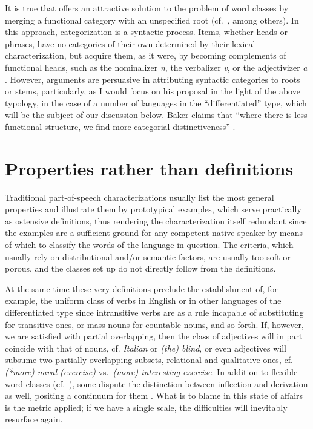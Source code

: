 \documentclass[output=paper]{langsci/langscibook}
\begin{document}
It is true that  offers an attractive solution to
the problem of word classes by merging a functional category with an
unspecified root (cf.\ \citealt{HalleMarantz1993,Marantz1997,Arad2003,Panagiotidis2015},
among others). In this approach,
categorization is a syntactic process. Items, whether
heads or phrases, have no categories of their own determined by their lexical
characterization, but acquire them, as it were, by becoming complements of
functional heads, such as the nominalizer \emph{n}, the verbalizer \emph{v}, or
the adjectivizer \emph{a} \parencite[17]{Panagiotidis2015}. However,
 arguments are persuasive in attributing syntactic
categories to roots or stems, particularly, as I would
focus on his proposal in the light of the above typology, in the case of a
number of languages in the \enquote{differentiated} type, which will be the
subject of our discussion below. Baker claims that “where there is less
functional structure, we find more categorial distinctiveness”
\parencite[268]{Baker2003}.

\section{Properties rather than definitions}\label{sec:27.2}

Traditional part-of-speech characterizations usually list the most general
properties and illustrate them by prototypical examples, which serve
practically as ostensive definitions, thus rendering the characterization
itself redundant since the examples are a sufficient ground for any competent
native speaker by means of which to classify the words of the language in
question. The criteria, which usually rely on distributional and/or semantic
factors, are usually too soft or porous, and the classes set up do not directly
follow from the definitions.

At the same time these very definitions preclude the establishment of, for
example, the uniform class of verbs in English or in other languages of the
differentiated type since intransitive verbs are as a rule incapable of
substituting for transitive ones, or mass nouns for countable nouns, and so
forth. If, however, we are satisfied with partial overlapping, then the class
of adjectives will in part coincide with that of nouns, cf. \emph{Italian} or
\emph{(the) blind}, or even adjectives will subsume two partially overlapping
subsets, relational and qualitative ones, cf. \emph{(*more) naval (exercise)}
vs.\ \emph{(more) interesting exercise}. In addition to flexible word classes
(cf.\ \citealt{RijkhoffvanLier2013}), some dispute the distinction between
inflection and derivation as well, positing a continuum for them
\citep{Dressler1989}. What is to blame in this state of affairs is the metric
applied; if we have a single scale, the difficulties will inevitably resurface
again.
\end{document}
